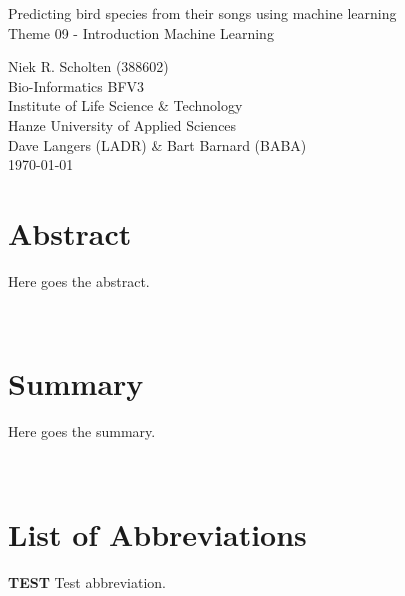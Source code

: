 \documentclass[
]{article}
\begin{document}
\begin{center}


    \Huge{Predicting bird species from their songs using machine learning}\\
    \vspace{\baselineskip}
    \LARGE{Theme 09 - Introduction Machine Learning}\\
    \vspace{\baselineskip}

\end{center}
\vspace{\baselineskip}

\normalsize
\vspace*{\fill}
\begin{flushright}
    Niek R. Scholten (388602)\\
    Bio-Informatics BFV3\\
    Institute of Life Science \& Technology\\
    Hanze University of Applied Sciences\\
    Dave Langers (LADR) \& Bart Barnard (BABA)\\
    \today
\end{flushright}
\newpage

\section*{Abstract}

Here goes the abstract.

\label{sec:abstract}~
\newpage

\section*{Summary}

Here goes the summary.

\label{sec:summ}~
\newpage

\section*{List of Abbreviations}

\textbf{TEST} Test abbreviation.

\label{sec:abvs}~

\newpage
\end{document}
